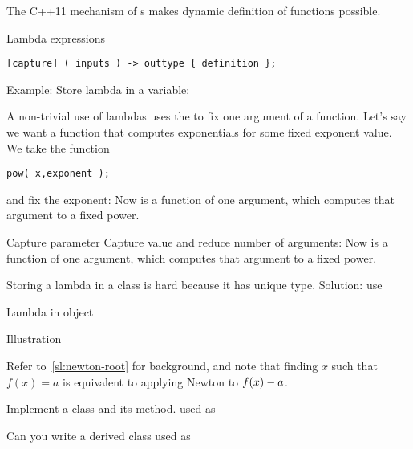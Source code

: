 
The C++11 mechanism of s makes
dynamic definition of functions possible.

\begin{block}{Lambda expressions}
  \label{sl:lambda-syntax}
\begin{verbatim}
[capture] ( inputs ) -> outtype { definition };
\end{verbatim}
Example:
Store lambda in a variable:
\end{block}

A non-trivial use of lambdas uses the  to fix one argument of a
function.
Let's say we want a function that computes exponentials for some fixed
exponent value. We take the 
 function
\begin{verbatim}
pow( x,exponent );
\end{verbatim}
and fix the exponent:
%
%
Now  is a function of one argument, which computes
that argument to a fixed power.

\begin{slide}{Capture parameter}
  \label{sl:lambda-capture}
  Capture value and reduce number of arguments:
  Now  is a function of one argument, which computes
  that argument to a fixed power.
\end{slide}

Storing a lambda in a class is hard because it has unique
type. Solution: use 

\begin{block}{Lambda in object}
  \label{sl:lambda-class}
\end{block}

\begin{block}{Illustration}
  \label{sl:lambda-classed}
\end{block}

\begin{exercise}
  \label{ex:newtonlambda}
  Refer to~\ref{sl:newton-root} for background, and note that finding
  $x$ such that $f(x)=a$ is equivalent to applying Newton to
  $f(x)-\nobreak a$.

  Implement a class  and its  method.
  used as
\end{exercise}

\begin{exercise}
  \label{ex:morenewtonlambda}
  Can you write a derived class  used as
\end{exercise}

